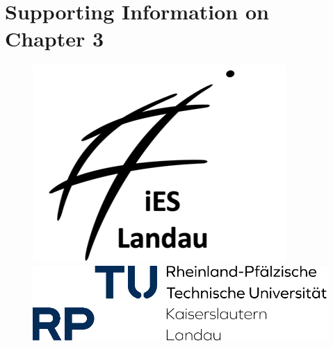 \section{Supporting Information on Chapter 3} \label{Annex_chap3} \begin{refsection}

\clearpage

\begin{figure}[ht]
  \centering
  \begin{minipage}{0.2\textwidth}
    \centering
    \includegraphics[width=\textwidth]{figures/ies logo.png}
  \end{minipage}
  \hfill
  \begin{minipage}{0.4\textwidth}
    \centering
    \includegraphics[width=\textwidth]{figures/logo_rptu.png}
  \end{minipage}
  \vspace{5cm}
\end{figure}


\end{refsection}
